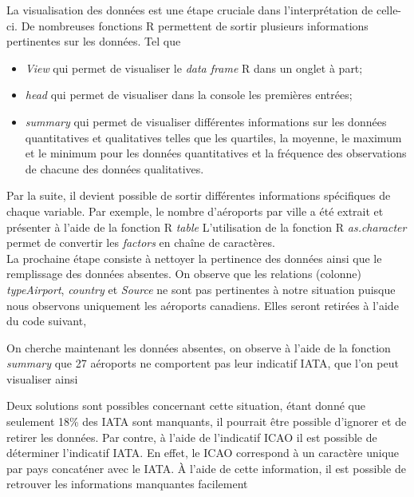 \documentclass{report}
\begin{document}
La visualisation des données est une étape cruciale dans l’interprétation de celle-ci. De nombreuses fonctions R permettent de sortir plusieurs informations pertinentes sur les données. Tel que
\begin{itemize}
\item \textit{View}\cite{Rfunction:View} qui permet de visualiser le \emph{data frame} R dans un onglet à part;
\item \textit{head} \cite{Rfunction:head} qui permet de visualiser dans la console les premières entrées;
\item \textit{summary}\cite{Rfunction:summary} qui permet de visualiser différentes informations sur les données quantitatives et qualitatives telles que les quartiles, la moyenne, le maximum et le minimum pour les données quantitatives  et la fréquence des observations de chacune des données qualitatives.
\end{itemize}
Par la suite, il devient possible de sortir différentes informations spécifiques de chaque variable. Par exemple, le nombre d'aéroports par ville a été extrait et présenter à l'aide de la fonction R \textit{table} \cite{Rfunction:table}
%
%
L'utilisation de la fonction R \textit{as.character}\cite{Rfunction:as.character} permet de convertir les \textit{factors} en chaîne de caractères. 
\\

La prochaine étape consiste à nettoyer la pertinence des données ainsi que le remplissage des données absentes. On observe que les relations (colonne) \textit{typeAirport}, \textit{country} et \textit{Source} ne sont pas pertinentes à notre situation puisque nous observons uniquement les aéroports canadiens. Elles seront retirées à l'aide du code suivant,

%
%

On cherche maintenant les données absentes, on observe à l'aide de la fonction \emph{summary} que 27 aéroports ne comportent pas leur indicatif IATA, que l'on peut visualiser ainsi

%
%

Deux solutions sont possibles concernant cette situation, étant donné que seulement 18\% des IATA sont manquants, il pourrait être possible d'ignorer et de retirer les données. Par contre, à l'aide de l'indicatif ICAO il est possible de déterminer l'indicatif IATA. En effet, le ICAO correspond à un caractère unique par pays concaténer avec le IATA. À l'aide de cette information, il est possible de retrouver les informations manquantes facilement 
\end{document}
